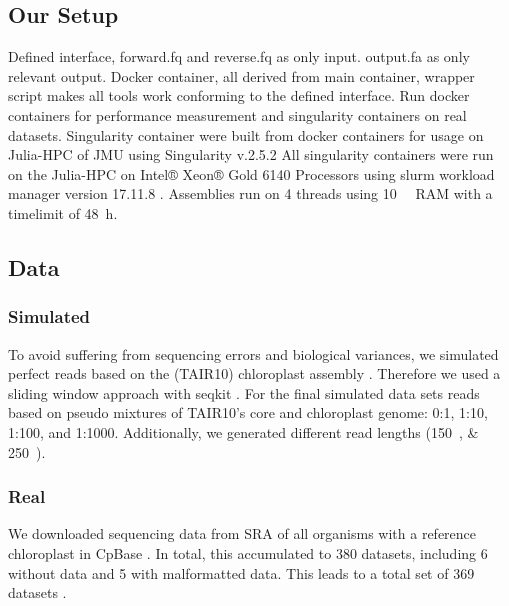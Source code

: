 \documentclass{bmcart}
\begin{document}
\subsection*{Our Setup}
Defined interface, forward.fq and reverse.fq as only input. output.fa as only relevant output.
Docker container, all derived from main container, wrapper script makes all tools work conforming to the defined interface. Run docker containers for performance measurement and singularity containers on real datasets.
Singularity container were built from docker containers for usage on Julia-HPC of JMU using Singularity v.2.5.2 \cite{kurtzer2017singularity}
All singularity containers were run on the Julia-HPC on Intel® Xeon® Gold \num{6140} Processors using slurm workload manager version 17.11.8 \cite{Jette02slurm}. Assemblies run on \num{4} threads using \SI{10}{\gibi\byte} RAM with a timelimit of \SI{48}{\hour}. 
\subsection*{Data}
\subsubsection*{Simulated}
To avoid suffering from sequencing errors and biological variances, we simulated perfect reads based on the  (TAIR10) chloroplast assembly \cite{tair10}.
Therefore we used a sliding window approach with seqkit \cite{seqkit} .
For the final simulated data sets reads based on pseudo mixtures of TAIR10's core and chloroplast genome:  \num{0}:\num{1}, \num{1}:\num{10}, \num{1}:\num{100}, and \num{1}:\num{1000}.
Additionally, we generated different read lengths (\SIlist{150;250}{\basepair}).


\subsubsection*{Real}
We downloaded sequencing data from SRA \cite{sra2010} of all organisms with a reference
chloroplast in CpBase \cite{cpbase}. In total, this accumulated to \num{380} datasets, including \num{6} without data and \num{5} with malformatted data. This leads to a total set of \num{369} datasets .
\end{document}
